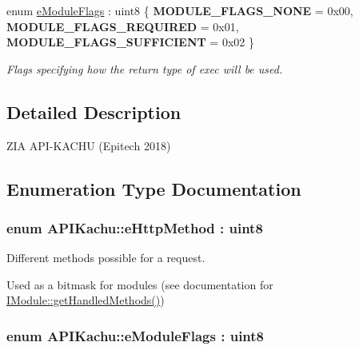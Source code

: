 \begin{DoxyCompactItemize}
\item 
enum \hyperlink{namespace_a_p_i_kachu_a89a2d383090085f6b3dbda8547b6b014}{e\+Module\+Flags} \+: uint8 \{ {\bfseries M\+O\+D\+U\+L\+E\+\_\+\+F\+L\+A\+G\+S\+\_\+\+N\+O\+NE} = 0x00, 
{\bfseries M\+O\+D\+U\+L\+E\+\_\+\+F\+L\+A\+G\+S\+\_\+\+R\+E\+Q\+U\+I\+R\+ED} = 0x01, 
{\bfseries M\+O\+D\+U\+L\+E\+\_\+\+F\+L\+A\+G\+S\+\_\+\+S\+U\+F\+F\+I\+C\+I\+E\+NT} = 0x02
 \}\begin{DoxyCompactList}\small\item\em Flags specifying how the return type of exec will be used. \end{DoxyCompactList}
\end{DoxyCompactItemize}


\subsection{Detailed Description}
Z\+IA A\+P\+I-\/\+K\+A\+C\+HU (Epitech 2018) 

\subsection{Enumeration Type Documentation}
\subsubsection[{\texorpdfstring{e\+Http\+Method}{eHttpMethod}}]{\setlength{\rightskip}{0pt plus 5cm}enum {\bf A\+P\+I\+Kachu\+::e\+Http\+Method} \+: uint8}\hypertarget{namespace_a_p_i_kachu_aeff09045bb4c289dc6f23d46950d830e}{}\label{namespace_a_p_i_kachu_aeff09045bb4c289dc6f23d46950d830e}


Different methods possible for a request. 

Used as a bitmask for modules (see documentation for \hyperlink{class_a_p_i_kachu_1_1_i_module_aaad7d8817c8b1344fbe310d7e5e85404}{I\+Module\+::get\+Handled\+Methods()}) 
\subsubsection[{\texorpdfstring{e\+Module\+Flags}{eModuleFlags}}]{\setlength{\rightskip}{0pt plus 5cm}enum {\bf A\+P\+I\+Kachu\+::e\+Module\+Flags} \+: uint8}\hypertarget{namespace_a_p_i_kachu_a89a2d383090085f6b3dbda8547b6b014}{}\label{namespace_a_p_i_kachu_a89a2d383090085f6b3dbda8547b6b014}


